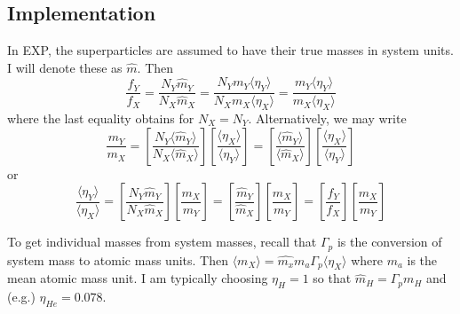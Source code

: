 \documentclass[12pt]{article}
\begin{document}
\subsection{Implementation}

In EXP, the superparticles are assumed to have their true masses in
system units.  I will denote these as $\hat{m}$.  Then
\begin{equation}
  \frac{f_Y}{f_X} = \frac{N_Y {\hat m}_Y}{N_X \hat{m}_X} = \frac{N_Y
    m_Y\langle\eta_Y\rangle}{N_X m_X \langle\eta_X\rangle} = 
  \frac{m_Y\langle\eta_Y\rangle}{m_X \langle\eta_X\rangle}
\end{equation}
where the last equality obtains for $N_X=N_Y$.  Alternatively, 
we may write
\begin{equation}
\frac{m_Y}{m_X} 
= \left[\frac{N_Y\langle\hat{m}_Y\rangle}{N_X\langle\hat{m}_X\rangle}\right]
\left[\frac{\langle\eta_X\rangle}{\langle\eta_Y\rangle}\right]
= \left[\frac{\langle\hat{m}_Y\rangle}{\langle\hat{m}_X\rangle}\right]
\left[\frac{\langle\eta_X\rangle}{\langle\eta_Y\rangle}\right]
\end{equation}
or
\begin{equation}
  \frac{\langle\eta_Y\rangle}{\langle\eta_X\rangle} = 
  \left[\frac{N_Y{\hat m}_Y}{N_X\hat{m}_X}\right]
  \left[\frac{m_X}{m_Y}\right] =
  \left[\frac{{\hat m}_Y}{\hat{m}_X}\right]
  \left[\frac{m_X}{m_Y}\right] =
  \left[\frac{f_Y}{f_X}\right]
  \left[\frac{m_X}{m_Y}\right]
\end{equation}

To get individual masses from system masses, recall that $\Gamma_p$ is
the conversion of system mass to atomic mass units.  Then
$\langle{m}_X\rangle = \hat{m_x}m_a\Gamma_p \langle\eta_X\rangle$
where $m_a$ is the mean atomic mass unit.  I am typically choosing
$\eta_H = 1$ so that $\hat{m}_H = \Gamma_p m_H$ and (e.g.) $\eta_{He}
= 0.078$.


\label{sec:ref}
\end{document}
